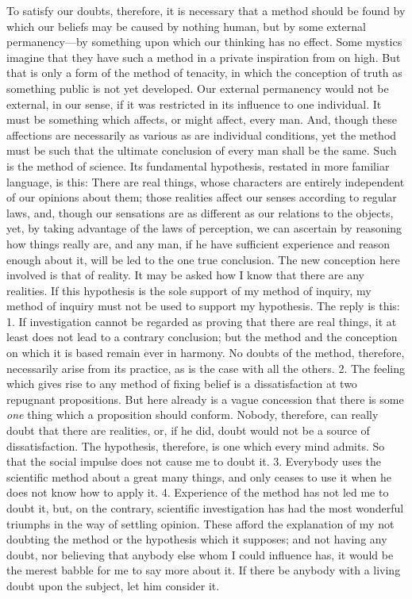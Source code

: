 To satisfy our doubts, therefore, it is necessary that a method should
be found by which our beliefs may be caused by nothing human, but by
some external per\-ma\-nen\-cy---by something upon which our thinking
has no effect. Some mystics imagine that they have such a method in a
private inspiration from on high. But that is only a form of the
method of tenacity, in which the conception of truth as something
public is not yet developed. Our external permanency would not be
external, in our sense, if it was restricted in its influence to one
individual. It must be something which affects, or might affect, every
man. And, though these affections are necessarily as various as are
individual conditions, yet the method must be such that the ultimate
conclusion of every man shall be the same. Such is the method of
science. Its fundamental hypothesis, restated in more familiar
language, is this: There are real things, whose characters are
entirely independent of our opinions about them; those realities
affect our senses according to regular laws, and, though our
sensations are as different as our relations to the objects, yet, by
taking advantage of the laws of perception, we can ascertain by
reasoning how things really are, and any man, if he have sufficient
experience  and reason enough about it, will be led to the
one true conclusion. The new conception here involved is that of
reality. It may be asked how I know that there are any realities. If
this hypothesis is the sole support of my method of inquiry, my method
of inquiry must not be used to support my hypothesis. The reply is
this: 1. If investigation cannot be regarded as proving that there are
real things, it at least does not lead to a contrary conclusion; but
the method and the conception on which it is based remain ever in
harmony. No doubts of the method, therefore, necessarily arise from
its practice, as is the case with all the others. 2. The feeling which
gives rise to any method of fixing belief is a dissatisfaction at two
repugnant propositions. But here already is a vague concession that
there is some \textit{one} thing which a proposition should conform.
Nobody, therefore, can really doubt that there are realities, or, if
he did, doubt would not be a source of dissatisfaction. The
hypothesis, therefore, is one which every mind admits. So that the
social impulse does not cause me to doubt it. 3. Everybody uses the
scientific method about a great many things, and only ceases to use it
when he does not know how to apply it. 4. Experience of the method has
not led me to doubt it, but, on the contrary, scientific investigation
has had the most wonderful triumphs in the way of settling opinion.
These afford the explanation of my not doubting the method or the
hypothesis which it supposes; and not having any doubt, nor believing
that anybody else whom I could influence has, it would be the merest
babble for me to say more about it. If there be anybody with a living
doubt upon the subject, let him consider it.

